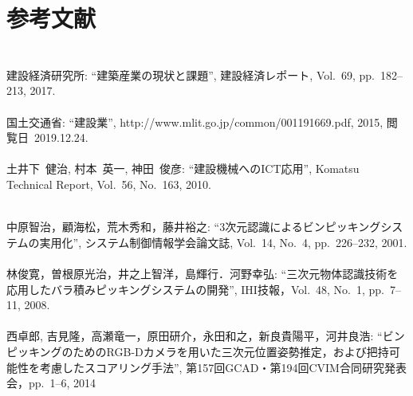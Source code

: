 \chapter*{参考文献}
\lhead[参考文献]{}
\thispagestyle{empty}

\newpage

\subsection*{}
\begin{mythebibliography}{}



\leavevmode \\建設経済研究所:
\newblock ``建築産業の現状と課題'',
\newblock 建設経済レポート, Vol.~69, pp.~182--213, 2017.
\\
\leavevmode \\国土交通省:
\newblock ``建設業'',
\newblock http://www.mlit.go.jp/common/001191669.pdf, 2015, 閲覧日~2019.12.24.
\\
\leavevmode \\土井下~健治, 村本~英一, 神田~俊彦:
\newblock ``建設機械へのICT応用'',
\newblock Komatsu Technical Report, Vol.~56, No.~163, 2010.
\\
\newpage

\leavevmode \\中原智治，顧海松，荒木秀和，藤井裕之:
\newblock ``3次元認識によるビンピッキングシステムの実用化'',
\newblock システム制御情報学会論文誌, Vol.~14, No.~4, pp.~226--232, 2001.
\\
\leavevmode \\林俊寛，曽根原光治，井之上智洋，島輝行．河野幸弘:
\newblock ``三次元物体認識技術を応用したバラ積みピッキングシステムの開発'',
\newblock IHI技報，Vol.~48, No.~1, pp.~7--11, 2008.
\\
\leavevmode \\西卓郎, 吉見隆，高瀬竜一，原田研介，永田和之，新良貴陽平，河井良浩:
\newblock ``ビンピッキングのためのRGB-Dカメラを用いた三次元位置姿勢推定，および把持可能性を考慮したスコアリング手法'',
\newblock 第157回GCAD・第194回CVIM合同研究発表会，pp.~1--6, 2014
\\


\end{mythebibliography}
